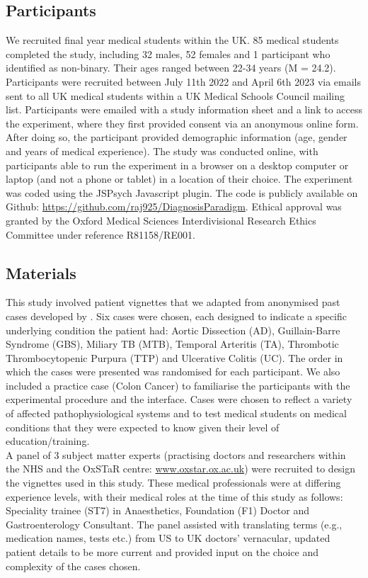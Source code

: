 \documentclass[a4paper, nobind]{templates/ociamthesis}
\begin{document}
\subsection{Participants}\label{participants}

We recruited final year medical students within the UK. 85 medical students completed the study, including 32 males, 52 females and 1 participant who identified as non-binary. Their ages ranged between 22-34 years (M = 24.2). Participants were recruited between July 11th 2022 and April 6th 2023 via emails sent to all UK medical students within a UK Medical Schools Council mailing list. Participants were emailed with a study information sheet and a link to access the experiment, where they first provided consent via an anonymous online form. After doing so, the participant provided demographic information (age, gender and years of medical experience). The study was conducted online, with participants able to run the experiment in a browser on a desktop computer or laptop (and not a phone or tablet) in a location of their choice. The experiment was coded using the JSPsych Javascript plugin. The code is publicly available on Github: \url{https://github.com/raj925/DiagnosisParadigm}. Ethical approval was granted by the Oxford Medical Sciences Interdivisional Research Ethics Committee under reference R81158/RE001.

\subsection{Materials}\label{materials}

This study involved patient vignettes that we adapted from anonymised past cases developed by \textcite{friedman_are_2001}. Six cases were chosen, each designed to indicate a specific underlying condition the patient had: Aortic Dissection (AD), Guillain-Barre Syndrome (GBS), Miliary TB (MTB), Temporal Arteritis (TA), Thrombotic Thrombocytopenic Purpura (TTP) and Ulcerative Colitis (UC). The order in which the cases were presented was randomised for each participant. We also included a practice case (Colon Cancer) to familiarise the participants with the experimental procedure and the interface. Cases were chosen to reflect a variety of affected pathophysiological systems and to test medical students on medical conditions that they were expected to know given their level of education/training.\\

A panel of 3 subject matter experts (practising doctors and researchers within the NHS and the OxSTaR centre: \url{www.oxstar.ox.ac.uk}) were recruited to design the vignettes used in this study. These medical professionals were at differing experience levels, with their medical roles at the time of this study as follows: Speciality trainee (ST7) in Anaesthetics, Foundation (F1) Doctor and Gastroenterology Consultant. The panel assisted with translating terms (e.g., medication names, tests etc.) from US to UK doctors' vernacular, updated patient details to be more current and provided input on the choice and complexity of the cases chosen.
\end{document}
